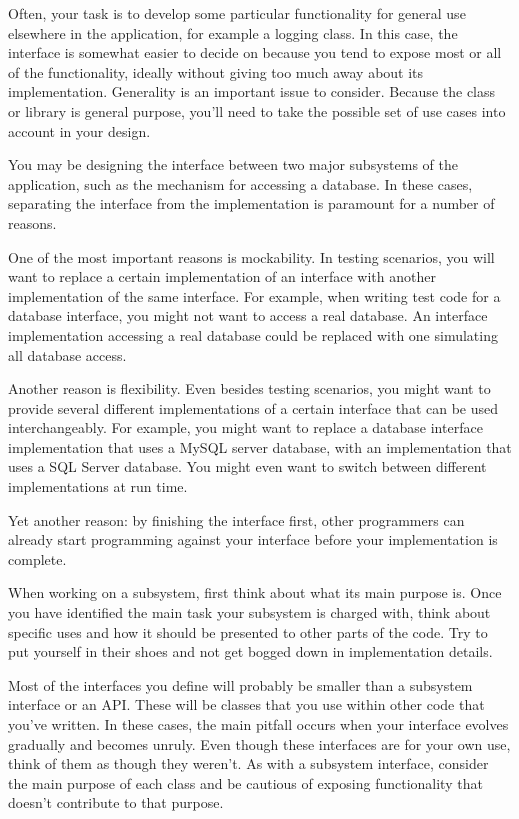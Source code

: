 
Often, your task is to develop some particular functionality for general use elsewhere in the application, for example a logging class. In this case, the interface is somewhat easier to decide on because you tend to expose most or all of the functionality, ideally without giving too much away about its implementation. Generality is an important issue to consider. Because the class or library is general purpose, you’ll need to take the possible set of use cases into account in your design.


You may be designing the interface between two major subsystems of the application, such as the mechanism for accessing a database. In these cases, separating the interface from the implementation is paramount for a number of reasons.

One of the most important reasons is mockability. In testing scenarios, you will want to replace a certain implementation of an interface with another implementation of the same interface. For example, when writing test code for a database interface, you might not want to access a real database. An interface implementation accessing a real database could be replaced with one simulating all database access.

Another reason is flexibility. Even besides testing scenarios, you might want to provide several different implementations of a certain interface that can be used interchangeably. For example, you might want to replace a database interface implementation that uses a MySQL server database, with an implementation that uses a SQL Server database. You might even want to switch between different implementations at run time.

Yet another reason: by finishing the interface first, other programmers can already start programming against your interface before your implementation is complete.

When working on a subsystem, first think about what its main purpose is. Once you have identified the main task your subsystem is charged with, think about specific uses and how it should be presented to other parts of the code. Try to put yourself in their shoes and not get bogged down in implementation details.


Most of the interfaces you define will probably be smaller than a subsystem interface or an API. These will be classes that you use within other code that you’ve written. In these cases, the main pitfall occurs when your interface evolves gradually and becomes unruly. Even though these interfaces are for your own use, think of them as though they weren’t. As with a subsystem interface, consider the main purpose of each class and be cautious of exposing functionality that doesn’t contribute to that purpose.


